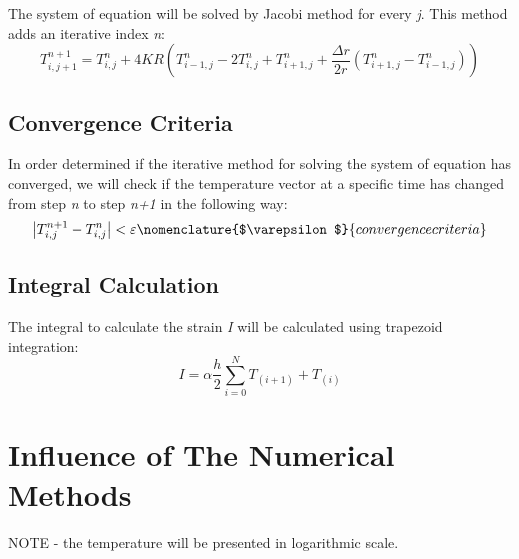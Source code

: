 \documentclass[11pt, a4paper]{article}
\begin{document}
\noindent The system of equation will be solved by Jacobi method for every \emph{j}. This method adds an iterative index \emph{n}:
\begin{equation}
    \displaystyle T_{i,j+1}^{n+1}=T_{i,j}^n+4KR\left(T_{i-1,j}^n-2T_{i,j}^n+T_{i+1,j}^n+\frac{\Delta r}{2r}\left(T_{i+1,j}^n-T_{i-1,j}^n\right)\right)
\end{equation}

\subsection{Convergence Criteria}
In order determined if the iterative method for solving the system of equation has converged, we will check if the temperature vector at a specific time has changed from step \emph{n} to step \emph{n+1} in the following way:
\begin{equation}
    \left|T_{i,j}^{n+1}-T_{i,j}^n\right|<\varepsilon
    \nomenclature{$\varepsilon$}{convergence criteria}
\end{equation}

\subsection{Integral Calculation}
The integral to calculate the strain \emph{I} will be calculated using trapezoid integration:
\begin{equation}
    I=\alpha\frac{h}{2}\sum_{i=0}^{N}{T_{\left(i+1\right)}+T_{\left(i\right)}}
\end{equation}

\section{Influence of The Numerical Methods}
NOTE - the temperature will be presented in logarithmic scale.
\end{document}
